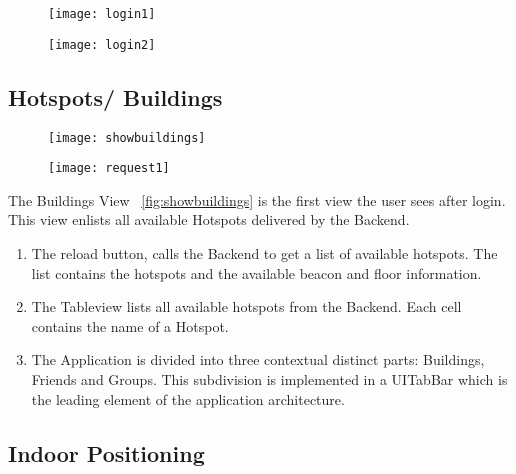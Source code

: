 \begin{figure}
\centering
\begin{minipage}{.5\textwidth}
  \centering
  \texttt{[image: login1]}
  \label{fig:login1}
\end{minipage}%
\begin{minipage}{.5\textwidth}
  \centering
  \texttt{[image: login2]}
  \label{fig:login2}
\end{minipage}
\end{figure}

\subsection{Hotspots/ Buildings}

\begin{figure}
\centering
\begin{minipage}{.5\textwidth}
  \centering
  \texttt{[image: showbuildings]}
  \label{fig:showbuildings}
\end{minipage}%
\begin{minipage}{.5\textwidth}
  \centering
  \texttt{[image: request1]}
  \label{fig:request1}
\end{minipage}
\end{figure}



The Buildings View ~\ref{fig:showbuildings} is the first view the user sees after login. This view enlists all available Hotspots delivered by the Backend.

\begin{enumerate}
  \item The reload button, calls the Backend to get a list of available hotspots. The list contains the hotspots and the available beacon and floor information.
  \item The Tableview lists all available hotspots from the Backend. Each cell contains the name of a Hotspot.
  \item The Application is divided into three contextual distinct parts: Buildings, Friends and Groups. This subdivision is implemented in a UITabBar which is the leading element of the application architecture.
\end{enumerate}

\subsection{Indoor Positioning}

